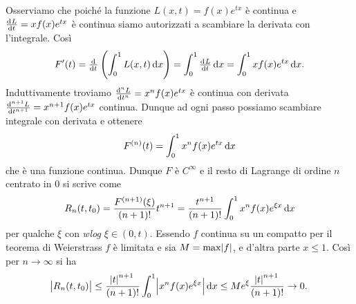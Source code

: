\documentclass[a4paper]{article}\par \usepackage{style}\par
\begin{document}
\begin{vares}
\end{vares}\par Osserviamo che poiché la funzione $ L(x, t) = f(x) e^{tx} $ è continua e $ \od[]{L}{t} = x f(x) e^{tx} $ è continua siamo autorizzati a scambiare la derivata con l'integrale. Così \[F'(t) = \od[]{}{t} \left(\int_{0}^{1} L(x, t) \dif{x}\right) = \int_{0}^{1} \od[]{L}{t}  \dif{x} = \int_{0}^{1} x f(x) e^{tx} \dif{x}. \] Induttivamente troviamo $ \od[n]{L}{t} = x^n f(x) e^{tx} $ è continua con derivata $ \od[n +1]{L}{t} = x^{n + 1} f(x) e^{tx} $ continua. Dunque ad ogni passo possiamo scambiare integrale con derivata e ottenere \[F^{(n)}(t) = \int_{0}^{1} x^n f(x) e^{tx} \dif{x}\] che è una funzione continua. Dunque $ F $ è $ C^{\infty} $ e il resto di Lagrange di ordine $ n $ centrato in $ 0 $ si scrive come \[R_n(t, t_0) = \frac{F^{(n + 1)}(\xi)}{(n + 1)!} t^{n + 1} = \frac{t^{n + 1}}{(n + 1)!} \int_{0}^{1} x^n f(x) e^{\xi x} \dif{x}\] per qualche $ \xi $ con \emph{wlog} $ \xi \in (0, t) $. Essendo $ f $ continua su un compatto per il teorema di Weierstrass $ f $ è limitata e sia $ M = \max{\abs{f}} $, e d'altra parte $ x \leq 1 $. Così per $ n \to \infty $ si ha
\begin{equation*}
  \abs{R_n(t, t_0)} \leq \frac{{\abs{t}}^{n + 1}}{(n + 1)!} \int_{0}^{1} \abs{x^n f(x) e^{\xi x}} \dif{x} \leq M e^{\xi} \frac{{\abs{t}}^{n + 1}}{(n + 1)!} \to 0.
\end{equation*}
\end{document}
